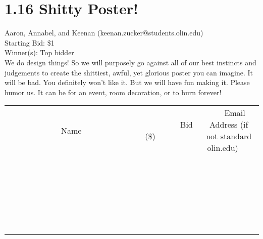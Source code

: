 \documentclass[11pt]{article}
\begin{document}
\section*{1.16 Shitty Poster!}
Aaron, Annabel, and Keenan (keenan.zucker@students.olin.edu) \\
Starting Bid: \$1 \\
Winner(s): 
Top bidder \\
We do design things! So we will purposely go against all of our best instincts and judgements to create the shittiest, awful, yet glorious poster you can imagine. It will be bad. You definitely won't like it. But we will have fun making it. Please humor us. It can be for an event, room decoration, or to burn forever! \\[6ex]
\begin{tabular}{c c c}
~~~~~~~~~~~~~Name~~~~~~~~~~~~~ & ~~~~~~~~~Bid (\$)~~~~~~~~~ & ~~~Email Address (if not standard olin.edu)~~~ \\
 & & \\
\hline
 & & \\
\hline
 & & \\
\hline
 & & \\
\hline
 & & \\
\hline
 & & \\
\hline
 & & \\
\hline
 & & \\
\hline
 & & \\
\hline
 & & \\
\hline
 & & \\
\hline
 & & \\
\hline
 & & \\
\hline
 & & \\
\hline
 & & \\
\hline
 & & \\
\hline
 & & \\
\hline
 & & \\
\hline
 & & \\
\hline
 & & \\
\hline
 & & \\
\hline
 & & \\
\hline
 & & \\
\hline
 & & \\
\hline
 & & \\
\hline
 & & \\
\hline
\end{tabular}
\clearpage
\end{document}
